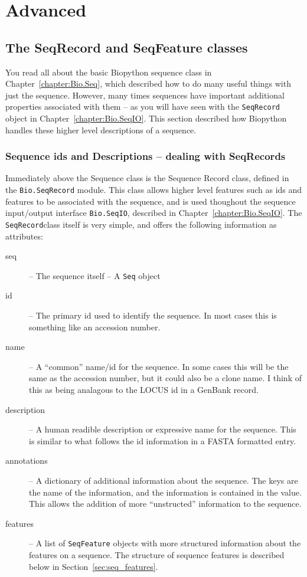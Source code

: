 \documentclass{report}
\begin{document}
\chapter{Advanced}
\label{chapter:advanced}

\section{The SeqRecord and SeqFeature classes}
\label{sec:advanced-seq}

You read all about the basic Biopython sequence class in Chapter~\ref{chapter:Bio.Seq}, which described how to do many useful things with just the sequence. However, many times sequences have important additional properties associated with them -- as you will have seen with the \verb|SeqRecord| object in Chapter~\ref{chapter:Bio.SeqIO}.
This section described how Biopython handles these higher level descriptions of a sequence.

\subsection{Sequence ids and Descriptions -- dealing with SeqRecords}

Immediately above the Sequence class is the Sequence Record class, defined in the \verb|Bio.SeqRecord| module. This class allows higher level features such as ids and features to be associated with the sequence, and is used thoughout the sequence input/output interface \verb|Bio.SeqIO|, described in Chapter~\ref{chapter:Bio.SeqIO}. The \verb|SeqRecord|class itself is very simple, and offers the following information as attributes:

\begin{description}
  \item[seq] -- The sequence itself -- A \verb|Seq| object

  \item[id] -- The primary id used to identify the sequence. In most cases this is something like an accession number.

  \item[name] -- A ``common'' name/id for the sequence. In some cases this will be the same as the accession number, but it could also be a clone name. I think of this as being analagous to the LOCUS id in a GenBank record.

  \item[description] -- A human readible description or expressive name for the sequence. This is similar to what follows the id information in a FASTA formatted entry.

  \item[annotations] -- A dictionary of additional information about the sequence. The keys are the name of the information, and the information is contained in the value. This allows the addition of more ``unstructed'' information to the sequence.

  \item[features] -- A list of \verb|SeqFeature| objects with more structured information about the features on a sequence. The structure of sequence features is described below in Section~\ref{sec:seq_features}.
\end{description}
\end{document}
